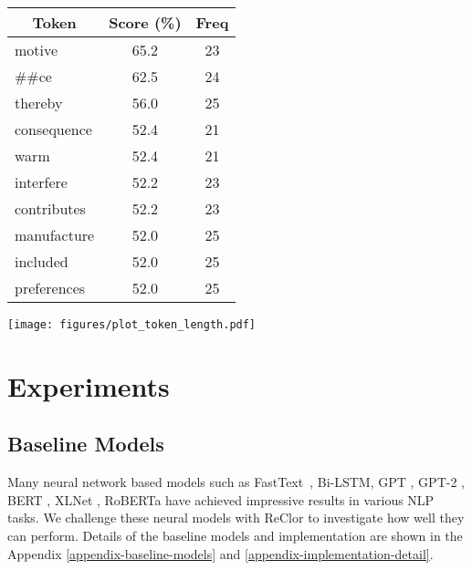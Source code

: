 \documentclass{article} \usepackage{iclr2020_conference,times}
\begin{document}
\begin{minipage}{\textwidth}
	\begin{minipage}[b]{0.49\textwidth}
		\centering
		\begin{tabular}{lcc}
			\multicolumn{1}{c}{\bf Token}  &\multicolumn{1}{c}{\bf Score (\%)} & \multicolumn{1}{c}{\bf Freq}
			\\ \hline 
            motive & 65.2 &  23 \\
            \#\#ce & 62.5 &  24 \\
            thereby & 56.0 & 25 \\
            consequence & 52.4 & 21 \\
            warm & 52.4 & 21 \\
            interfere & 52.2 & 23 \\
            contributes & 52.2 & 23 \\
            manufacture & 52.0 & 25 \\
            included & 52.0 & 25 \\
            preferences & 52.0 & 25 \\
		\end{tabular}
		\label{top10token}
	\end{minipage}
	\hfill
	\begin{minipage}[b]{0.49\textwidth}
		\centering
		\texttt{[image: figures/plot\_token\_length.pdf]}
		\label{plot_prob}
	\end{minipage}
\end{minipage}

	
\section{Experiments}
\subsection{Baseline Models}
Many neural network based models such as FastText~\citep{joulin2017bag}, Bi-LSTM, GPT \citep{radford2018improving}, GPT-2 \citep{radford2019language}, BERT \citep{devlin2019bert}, XLNet \citep{yang2019xlnet}, RoBERTa \citep{liu2019roberta} have achieved impressive results in various NLP tasks. We challenge these neural models with ReClor to investigate how well they can perform. Details of the baseline models and implementation are shown in the Appendix \ref{appendix-baseline-models} and \ref{appendix-implementation-detail}.
\end{document}
